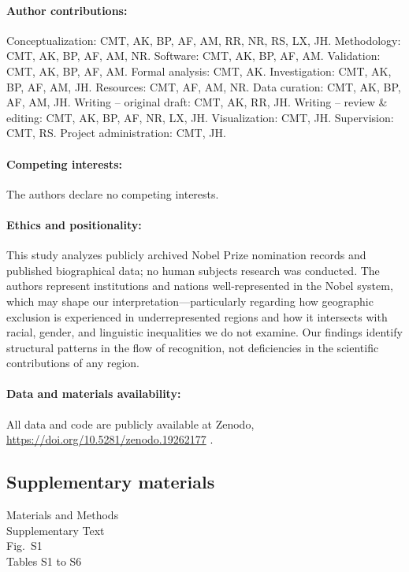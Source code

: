 \documentclass[12pt]{article}
\begin{document}
\paragraph*{Author contributions:}
Conceptualization: CMT, AK, BP, AF, AM, RR, NR, RS, LX, JH.
Methodology: CMT, AK, BP, AF, AM, NR.
Software: CMT, AK, BP, AF, AM.
Validation: CMT, AK, BP, AF, AM.
Formal analysis: CMT, AK.
Investigation: CMT, AK, BP, AF, AM, JH.
Resources: CMT, AF, AM, NR.
Data curation: CMT, AK, BP, AF, AM, JH.
Writing -- original draft: CMT, AK, RR, JH.
Writing -- review \& editing: CMT, AK, BP, AF, NR, LX, JH.
Visualization: CMT, JH.
Supervision: CMT, RS.
Project administration: CMT, JH.

\paragraph*{Competing interests:} The authors declare no competing interests.

\paragraph*{Ethics and positionality:} This study analyzes publicly archived Nobel Prize nomination records and published biographical data; no human subjects research was conducted. The authors represent institutions and nations well-represented in the Nobel system, which may shape our interpretation---particularly regarding how geographic exclusion is experienced in underrepresented regions and how it intersects with racial, gender, and linguistic inequalities we do not examine. Our findings identify structural patterns in the flow of recognition, not deficiencies in the scientific contributions of any region.

\paragraph*{Data and materials availability:} All data and code are publicly available at Zenodo, \url{https://doi.org/10.5281/zenodo.19262177} \cite{nobelgithub}.

\subsection*{Supplementary materials}
Materials and Methods\\
Supplementary Text\\
Fig.\ S1\\
Tables S1 to S6\\
\end{document}
